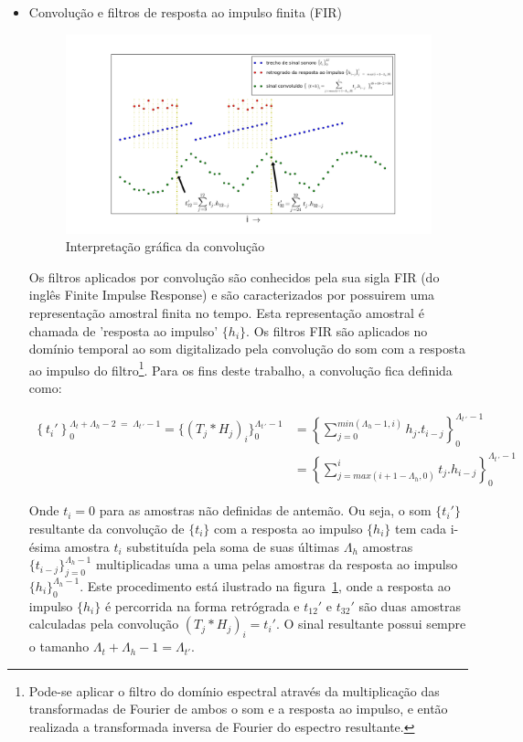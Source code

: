 \begin{itemize}

\item  Convolução e filtros de resposta ao impulso finita (FIR)

\begin{figure}[h!]
    \centering
        \includegraphics[width=\textwidth]{figuras/convolucao______}
    \caption{Interpretação gráfica da convolução}
        \label{fig:conv}
\end{figure}

Os filtros aplicados por convolução são conhecidos
pela sua sigla FIR (do inglês Finite Impulse Response)
e são caracterizados por possuirem uma representação amostral
finita no tempo. Esta representação amostral é chamada
de 'resposta ao impulso' $\{h_i\}$. Os filtros FIR são aplicados 
no domínio temporal ao som
digitalizado pela convolução do som com a 
resposta ao impulso do filtro\footnote{Pode-se aplicar o filtro do domínio espectral através da multiplicação das transformadas de Fourier de ambos o som e a resposta ao impulso, e então realizada a transformada inversa de Fourier do espectro resultante.\cite{Openheim}}. Para os fins deste trabalho, a
convolução fica definida como:

\begin{equation}\label{eq:conv}
\begin{split}
\left\{t_i'\right\}_0^{\Lambda_t+\Lambda_h-2\; = \;\Lambda_{t\, '}-1} =\{(T_j*H_j)_i\}_0^{\Lambda_{t \, '}-1} & =\left \{ \sum_{j=0}^{min(\Lambda_h-1,i)}h_{j} . t_{i-j} \right \}_0^{\Lambda_{t\, '}-1} \\
    & =\left \{ \sum_{j=max(i+1-\Lambda_h,0)}^{i}t_j . h_{i-j} \right \}_0^{\Lambda_{t\, '}-1}
\end{split}
\end{equation}

Onde $t_i=0$ para as
amostras não definidas de antemão.
Ou seja, o som $\{t_i'\}$ resultante da convolução de $\{t_i\}$ com a resposta ao impulso $\{h_i\}$
tem cada i-ésima amostra $t_i$ substituída pela soma de suas últimas $\Lambda_h$ amostras $\{t_{i-j}\}_{j=0}^{\Lambda_h-1}$
multiplicadas uma a uma pelas amostras da resposta ao impulso $\{h_i\}_0^{\Lambda_h-1}$. Este
procedimento está ilustrado na figura~\ref{fig:conv}, onde a resposta ao impulso $\{h_i\}$
é percorrida na forma retrógrada e
$t_{12}'$ e $t_{32}'$ são duas amostras calculadas
pela convolução $(T_j*H_j)_i=t_i'$. O sinal resultante possui
sempre o tamanho $\Lambda_t+\Lambda_h -1=\Lambda_{t'}$.



\end{itemize}
